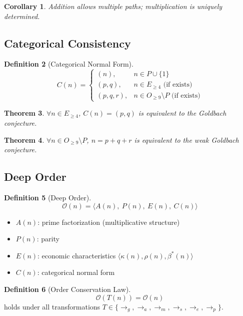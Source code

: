 \documentclass[12pt]{article}
\newtheorem{theorem}{Theorem}[section]
\newtheorem{corollary}[theorem]{Corollary}
\theoremstyle{definition}
\newtheorem{definition}[theorem]{Definition}
\begin{document}
\begin{corollary}
Addition allows multiple paths; multiplication is uniquely determined.
\end{corollary}

\subsection{Categorical Consistency}

\begin{definition}[Categorical Normal Form]
\[
C(n) =
\begin{cases}
(n), & n \in P \cup \{1\} \\
(p,q), & n \in E_{\geq 4} \text{ (if exists)} \\
(p,q,r), & n \in O_{\geq 9} \setminus P \text{ (if exists)}
\end{cases}
\]
\end{definition}

\begin{theorem}
\(\forall n \in E_{\geq 4}\), \(C(n) = (p,q)\) is equivalent to the Goldbach conjecture.
\end{theorem}

\begin{theorem}
\(\forall n \in O_{\geq 9} \setminus P\), \(n = p+q+r\) is equivalent to the weak Goldbach conjecture.
\end{theorem}

\subsection{Deep Order}

\begin{definition}[Deep Order]
\[
\mathcal{O}(n) = \langle A(n),\ P(n),\ E(n),\ C(n) \rangle
\]
\begin{itemize}
    \item \(A(n)\): prime factorization (multiplicative structure)
    \item \(P(n)\): parity
    \item \(E(n)\): economic characteristics \(\langle \kappa(n), \rho(n), \beta^*(n) \rangle\)
    \item \(C(n)\): categorical normal form
\end{itemize}
\end{definition}

\begin{definition}[Order Conservation Law]
\[
\mathcal{O}(T(n)) = \mathcal{O}(n)
\]
holds under all transformations \(T \in \{\rightarrow_g, \rightarrow_a, \rightarrow_m, \rightarrow_s, \rightarrow_e, \rightarrow_p\}\).
\end{definition}
\end{document}
